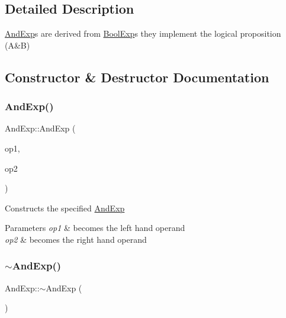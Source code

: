 \subsection{Detailed Description}
\mbox{\hyperlink{classAndExp}{And\+Exp}}\textquotesingle{}s are derived from \mbox{\hyperlink{classBoolExp}{Bool\+Exp}}\textquotesingle{}s they implement the logical proposition (A\&B) 

\subsection{Constructor \& Destructor Documentation}
\mbox{\label{classAndExp_a5a3124ff6fd4adca49a702f075100607}} 
\subsubsection{\texorpdfstring{And\+Exp()}{AndExp()}}
{\footnotesize\ttfamily And\+Exp\+::\+And\+Exp (\begin{DoxyParamCaption}\item[{shared\+\_\+ptr$<$ \mbox{\hyperlink{classBoolExp}{Bool\+Exp}} $>$}]{op1,  }\item[{shared\+\_\+ptr$<$ \mbox{\hyperlink{classBoolExp}{Bool\+Exp}} $>$}]{op2 }\end{DoxyParamCaption})}

Constructs the specified \mbox{\hyperlink{classAndExp}{And\+Exp}} 
\begin{DoxyParams}{Parameters}
{\em op1} & becomes the left hand operand \\
\hline
{\em op2} & becomes the right hand operand \\
\hline
\end{DoxyParams}
\mbox{\label{classAndExp_ab42437c5641d21c116bf0c90532b9075}} 
\subsubsection{\texorpdfstring{$\sim$\+And\+Exp()}{~AndExp()}}
{\footnotesize\ttfamily And\+Exp\+::$\sim$\+And\+Exp (\begin{DoxyParamCaption}{ }\end{DoxyParamCaption})\hspace{0.3cm}{\ttfamily [virtual]}}

